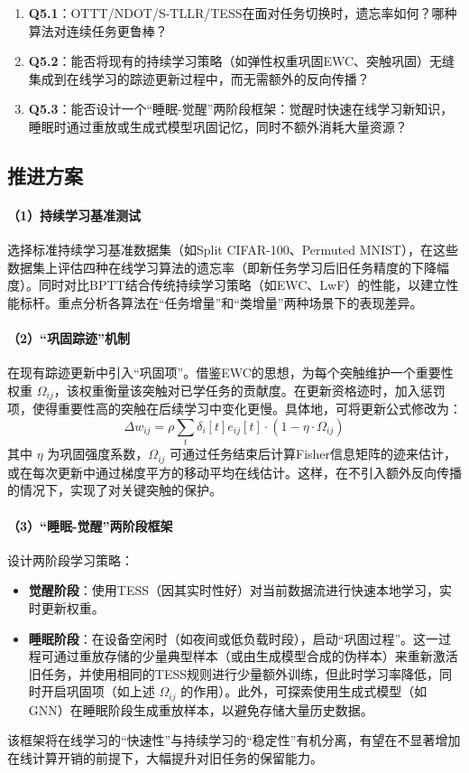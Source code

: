 \documentclass{article}
\begin{document}
\begin{enumerate}
    \item \textbf{Q5.1}：OTTT/NDOT/S-TLLR/TESS在面对任务切换时，遗忘率如何？哪种算法对连续任务更鲁棒？
    \item \textbf{Q5.2}：能否将现有的持续学习策略（如弹性权重巩固EWC、突触巩固）无缝集成到在线学习的踪迹更新过程中，而无需额外的反向传播？
    \item \textbf{Q5.3}：能否设计一个“睡眠-觉醒”两阶段框架：觉醒时快速在线学习新知识，睡眠时通过重放或生成式模型巩固记忆，同时不额外消耗大量资源？
\end{enumerate}

\subsection{推进方案}

\paragraph{（1）持续学习基准测试}
选择标准持续学习基准数据集（如Split CIFAR-100、Permuted MNIST），在这些数据集上评估四种在线学习算法的遗忘率（即新任务学习后旧任务精度的下降幅度）。同时对比BPTT结合传统持续学习策略（如EWC、LwF）的性能，以建立性能标杆。重点分析各算法在“任务增量”和“类增量”两种场景下的表现差异。

\paragraph{（2）“巩固踪迹”机制}
在现有踪迹更新中引入“巩固项”。借鉴EWC的思想，为每个突触维护一个重要性权重 \(\Omega_{ij}\)，该权重衡量该突触对已学任务的贡献度。在更新资格迹时，加入惩罚项，使得重要性高的突触在后续学习中变化更慢。具体地，可将更新公式修改为：
\[
\Delta w_{ij} = \rho \sum_t \delta_i[t] e_{ij}[t] \cdot (1 - \eta \cdot \Omega_{ij})
\]
其中 \(\eta\) 为巩固强度系数，\(\Omega_{ij}\) 可通过任务结束后计算Fisher信息矩阵的迹来估计，或在每次更新中通过梯度平方的移动平均在线估计。这样，在不引入额外反向传播的情况下，实现了对关键突触的保护。

\paragraph{（3）“睡眠-觉醒”两阶段框架}
设计两阶段学习策略：
\begin{itemize}
    \item \textbf{觉醒阶段}：使用TESS（因其实时性好）对当前数据流进行快速本地学习，实时更新权重。
    \item \textbf{睡眠阶段}：在设备空闲时（如夜间或低负载时段），启动“巩固过程”。这一过程可通过重放存储的少量典型样本（或由生成模型合成的伪样本）来重新激活旧任务，并使用相同的TESS规则进行少量额外训练，但此时学习率降低，同时开启巩固项（如上述 \(\Omega_{ij}\) 的作用）。此外，可探索使用生成式模型（如GNN）在睡眠阶段生成重放样本，以避免存储大量历史数据。
\end{itemize}
该框架将在线学习的“快速性”与持续学习的“稳定性”有机分离，有望在不显著增加在线计算开销的前提下，大幅提升对旧任务的保留能力。
\end{document}
